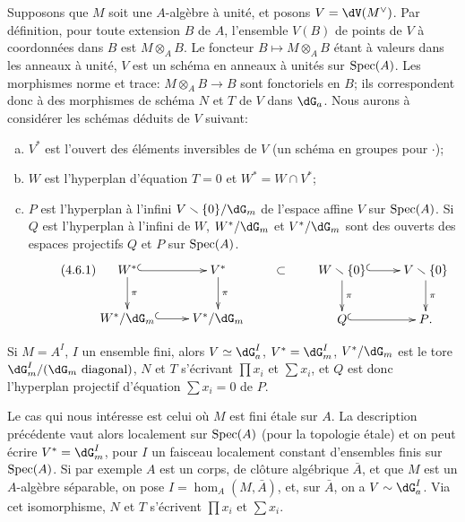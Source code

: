 Supposons que $M$ soit une $A$-algèbre à unité, et posons 
$V=\dV(M^\vee)$. Par définition, pour toute extension $B$ de $A$, l'ensemble 
$V(B)$ de points de $V$ à coordonnées dans $B$ est $M\otimes_A B$. Le 
foncteur $B\mapsto M\otimes_A B$ étant à valeurs dans les anneaux à 
unité, $V$ est un schéma en anneaux à unités sur $\operatorname{Spec}(A)$. Les 
morphismes norme et trace: $M\otimes_A B\to B$ sont fonctoriels en $B$; ils 
correspondent donc à des morphismes de schéma $N$ et $T$ de $V$ dans 
$\dG_a$. Nous aurons à considérer les schémas déduits de $V$ suivant: 
\begin{enumerate}[a)]
  \item $V^\ast$ est l'ouvert des éléments inversibles de $V$ (un schéma 
    en groupes pour $\cdot$);
  \item $W$ est l'hyperplan d'équation $T=0$ et $W^\ast=W\cap V^\ast$; 
  \item $P$ est l'hyperplan à l'infini $V\setminus \{0\}/\dG_m$ de l'espace 
    affine $V$ sur $\operatorname{Spec}(A)$. Si $Q$ est l'hyperplan à l'infini de $W$, 
    $W^\ast/\dG_m$ et $V^\ast/\dG_m$ sont des ouverts des espaces projectifs 
    $Q$ et $P$ sur $\operatorname{Spec}(A)$. 
    \begin{equation*}\tag{4.6.1}\label{VI:eq:4-6-1}
    \xymatrix{
      W^\ast \ar@{^{(}->}[r] \ar[d]^-\pi 
        & V^\ast \ar[d]^-\pi \\
      W^\ast/\dG_m \ar@{^{(}->}[r] 
        & V^\ast/\dG_m 
    }\qquad\subset\qquad
    \xymatrix{
      W\setminus \{0\} \ar@{^{(}->}[r] \ar[d]^-\pi 
        & V\setminus \{0\} \ar[d]^-\pi \\
      Q \ar@{^{(}->}[r] 
        & P \text{.}
    }
    \end{equation*}
\end{enumerate}

Si $M=A^I$, $I$ un ensemble fini, alors $V\simeq \dG_a^I$, $V^\ast=\dG_m^I$, 
$V^\ast/\dG_m$ est le tore $\dG_m^I/(\dG_m\text{ diagonal})$, $N$ et $T$ 
s'écrivant $\prod x_i$ et $\sum x_i$, et $Q$ est donc l'hyperplan 
projectif d'équation $\sum x_i=0$ de $P$. 

Le cas qui nous intéresse est celui où $M$ est fini étale sur $A$. La 
description précédente vaut alors localement sur $\operatorname{Spec}(A)$ (pour la 
topologie étale) et on peut écrire $V^\ast=\dG_m^I$, pour $I$ un faisceau 
localement constant d'ensembles finis sur $\operatorname{Spec}(A)$. Si par exemple $A$ est un 
corps, de clôture algébrique $\bar A$, et que $M$ est un $A$-algèbre 
séparable, on pose $I=\hom_A(M,\bar A)$, et, sur $\bar A$, on a 
$V\sim \dG_a^I$. Via cet isomorphisme, $N$ et $T$ s'écrivent $\prod x_i$ et 
$\sum x_i$. 





